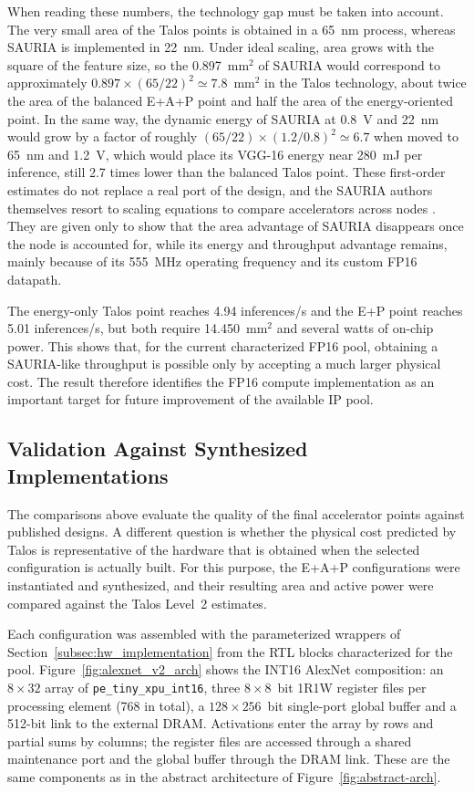 When reading these numbers, the technology gap must be taken into
account. The very small area of the Talos points is obtained in a
65~nm process, whereas SAURIA is implemented in 22~nm. Under ideal
scaling, area grows with the square of the feature size, so the
0.897~mm$^2$ of SAURIA would correspond to approximately
$0.897\times(65/22)^2\simeq7.8$~mm$^2$ in the Talos technology, about
twice the area of the balanced E+A+P point and half the area of the
energy-oriented point. In the same way, the dynamic energy of SAURIA
at 0.8~V and 22~nm would grow by a factor of roughly
$(65/22)\times(1.2/0.8)^2\simeq6.7$ when moved to 65~nm and 1.2~V,
which would place its VGG-16 energy near 280~mJ per inference, still
2.7 times lower than the balanced Talos point. These first-order
estimates do not replace a real port of the design, and the SAURIA
authors themselves resort to scaling equations to compare
accelerators across nodes \cite{sauria2023}. They are given only to
show that the area advantage of SAURIA disappears once the node is
accounted for, while its energy and throughput advantage remains,
mainly because of its 555~MHz operating frequency and its custom FP16
datapath.

The energy-only Talos point reaches 4.94 inferences/s and the E+P point
reaches 5.01 inferences/s, but both require 14.450~mm$^2$ and several
watts of on-chip power. This shows that, for the current characterized
FP16 pool, obtaining a SAURIA-like throughput is possible only by
accepting a much larger physical cost. The result therefore identifies
the FP16 compute implementation as an important target for future
improvement of the available IP pool.

\subsection{Validation Against Synthesized Implementations}
\label{sec:synthesis_validation}

The comparisons above evaluate the quality of the final accelerator
points against published designs. A different question is whether the
physical cost predicted by Talos is representative of the hardware
that is obtained when the selected configuration is actually built.
For this purpose, the E+A+P configurations were instantiated and
synthesized, and their resulting area and active power were compared
against the Talos Level~2 estimates.

Each configuration was assembled with the parameterized wrappers of
Section~\ref{subsec:hw_implementation} from the RTL blocks
characterized for the pool. Figure~\ref{fig:alexnet_v2_arch} shows the
INT16 AlexNet composition: an $8\times32$ array of
\texttt{pe\_tiny\_xpu\_int16}, three $8\times8$~bit 1R1W register
files per processing element (768 in total), a $128\times256$~bit
single-port global buffer and a 512-bit link to the external DRAM.
Activations enter the array by rows and partial sums by columns; the
register files are accessed through a shared maintenance port and the
global buffer through the DRAM link. These are the same components as
in the abstract architecture of Figure~\ref{fig:abstract-arch}.

